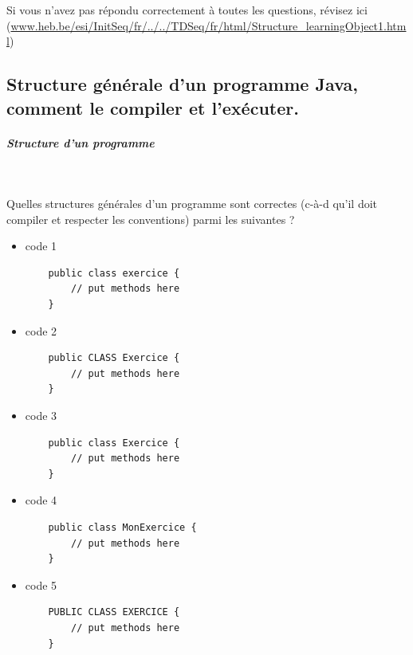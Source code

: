 \documentclass[11pt,a4paper]{article}
\begin{document}
            \par
        Si vous n'avez pas r\'epondu correctement \`a toutes les questions, 
        r\'evisez ici (\url{www.heb.be/esi/InitSeq/fr/../../TDSeq/fr/html/Structure\_learningObject1.html})
            \par
        \subsection{Structure g\'en\'erale d'un programme Java, comment le compiler et l'ex\'ecuter.}
			
		\subparagraph{Structure d'un programme} 
		
                \textcolor{white}{.} \par
            Quelles structures g\'en\'erales d'un programme sont correctes 
							(c-\`a-d qu'il doit compiler et respecter les conventions) parmi les suivantes ?
						
            \begin{itemize} 
        
            \item[ \ding{"6F} ]  
							code 1
							\begin{verbatim}
    public class exercice {
        // put methods here  
    }\end{verbatim}
        
            \item[ \ding{"6F} ]  
							code 2
							\begin{verbatim}
    public CLASS Exercice {
        // put methods here  
    }\end{verbatim}
        
            \item[ \ding{"6F} ] 
							code 3 
							\begin{verbatim}
    public class Exercice {  
        // put methods here  
    }\end{verbatim}
        
            \item[ \ding{"6F} ]  
							code 4 
							\begin{verbatim}
    public class MonExercice {  
        // put methods here  
    }\end{verbatim}
        
            \item[ \ding{"6F} ]  
							code 5 
							\begin{verbatim}
    PUBLIC CLASS EXERCICE { 
        // put methods here  
    }\end{verbatim}
        
            \end{itemize} 
        
\end{document}
